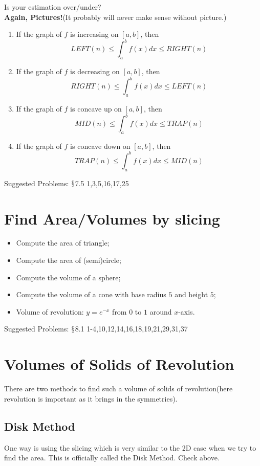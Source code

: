 \documentclass[12pt]{article}
\theoremstyle{definition}
\theoremstyle{definition}
\theoremstyle{remark}
\theoremstyle{definition}
\theoremstyle{definition}
\theoremstyle{definition}
\begin{document}
Is your estimation over/under?\\

\textbf{Again, Pictures!}(It probably will never make sense without picture.)
\begin{enumerate}
\item If the graph of $f$ is increasing on $[a,b]$, then $$LEFT(n)\leq \int^b_a f(x) dx \leq RIGHT(n)$$
\item If the graph of $f$ is decreasing on $[a,b]$, then $$RIGHT(n)\leq \int^b_a f(x) dx \leq LEFT(n)$$
\item If the graph of $f$ is concave up on $[a,b]$, then $$MID(n)\leq \int^b_a f(x) dx \leq TRAP(n)$$
\item If the graph of $f$ is concave down on $[a,b]$, then $$TRAP(n)\leq \int^b_a f(x) dx \leq MID(n)$$

\end{enumerate}

Suggested Problems: $\mathsection$7.5	1,3,5,16,17,25



\section{Find Area/Volumes by slicing}
\begin{itemize}
	\item Compute the area of triangle;
	\item Compute the area of (semi)circle;
	\item Compute the volume of a sphere; 
	\item Compute the volume of a cone with base radius $5$ and height $5$; 
	\item Volume of revolution: $y = e^{-x}$ from $0$ to $1$ around $x$-axis.
\end{itemize}

Suggested Problems: $\mathsection$8.1	1-4,10,12,14,16,18,19,21,29,31,37

\section{Volumes of Solids of Revolution}
There are two methods to find such a volume of solids of revolution(here revolution is important as it brings in the symmetries).
\subsection{Disk Method}

 One way is using the slicing which is very similar to the 2D case when we try to find the area. This is officially called the Disk Method.
Check above.
\end{document}
